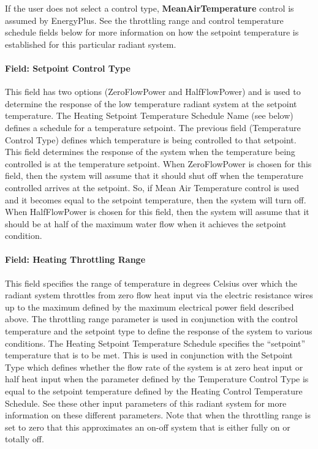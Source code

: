 If the user does not select a control type, \textbf{MeanAirTemperature} control is assumed by EnergyPlus. See the throttling range and control temperature schedule fields below for more information on how the setpoint temperature is established for this particular radiant system.

\paragraph{Field: Setpoint Control Type}\label{field-electric-radiant-system-setpoint-control-type}

This field has two options (ZeroFlowPower and HalfFlowPower) and is used to determine the response of the low temperature radiant system at the setpoint temperature.  The Heating Setpoint Temperature Schedule Name (see below) defines a schedule for a temperature setpoint.  The previous field (Temperature Control Type) defines which temperature is being controlled to that setpoint.  This field determines the response of the system when the temperature being controlled is at the temperature setpoint.  When ZeroFlowPower is chosen for this field, then the system will assume that it should shut off when the temperature controlled arrives at the setpoint.  So, if Mean Air Temperature control is used and it becomes equal to the setpoint temperature, then the system will turn off.  When HalfFlowPower is chosen for this field, then the system will assume that it should be at half of the maximum water flow when it achieves the setpoint condition.

\paragraph{Field: Heating Throttling Range}\label{field-heating-throttling-range}

This field specifies the range of temperature in degrees Celsius over which the radiant system throttles from zero flow heat input via the electric resistance wires up to the maximum defined by the maximum electrical power field described above. The throttling range parameter is used in conjunction with the control temperature and the setpoint type to define the response of the system to various conditions. The Heating Setpoint Temperature Schedule specifies the ``setpoint'' temperature that is to be met.  This is used in conjunction with the Setpoint Type which defines whether the flow rate of the system is at zero heat input or half heat input when the parameter defined by the Temperature Control Type is equal to the setpoint temperature defined by the Heating Control Temperature Schedule.  See these other input parameters of this radiant system for more information on these different parameters.  Note that when the throttling range is set to zero that this approximates an on-off system that is either fully on or totally off.

